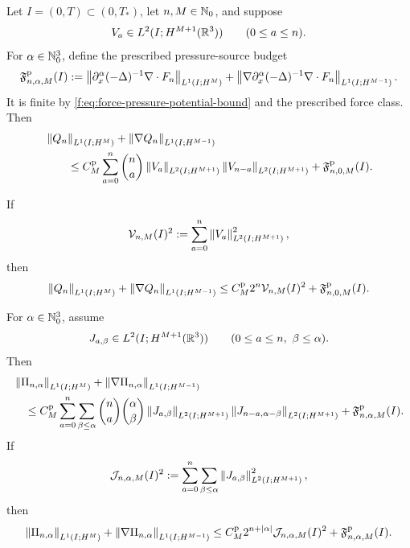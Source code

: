 \begin{theorem}
\label{f:thm:formal-finite-row-pressure}
Let \(I=(0,T)\subset(0,T_*)\), let \(n,M\in\mathbb N_0\), and suppose
\[
 V_a\in L^2(I;H^{M+1}(\mathbb R^3))
 \qquad(0\le a\le n).
\]
For \(\alpha\in\mathbb N_0^3\), define the prescribed pressure-source budget
\begin{equation}
 \mathfrak F^{\rm p}_{n,\alpha,M}(I)
 :=\left\lVert \partial_x^\alpha(-\Delta)^{-1}\nabla\cdot F_n\right\rVert_{L^1(I;H^M)}
 +\left\lVert \nabla\partial_x^\alpha(-\Delta)^{-1}\nabla\cdot F_n\right\rVert_{L^1(I;H^{M-1})}.
 \label{f:eq:force-pressure-budget}
\end{equation}
It is finite by \eqref{f:eq:force-pressure-potential-bound} and the prescribed
force class.
Then
\begin{align}
 &\left\lVert Q_n\right\rVert_{L^1(I;H^M)}
 +\left\lVert \nabla Q_n\right\rVert_{L^1(I;H^{M-1})}
 \notag\\
 &\qquad\le
 C_M^{\rm p}\sum_{a=0}^{n}\binom na
 \left\lVert V_a\right\rVert_{L^2(I;H^{M+1})}
 \left\lVert V_{n-a}\right\rVert_{L^2(I;H^{M+1})}
 +\mathfrak F^{\rm p}_{n,0,M}(I).
 \label{f:eq:formal-finite-pressure-L1}
\end{align}
\begin{samepage}
If
\[
 \mathcal V_{n,M}(I)^2
 :=\sum_{a=0}^{n}
 \left\lVert V_a\right\rVert_{L^2(I;H^{M+1})}^2,
\]
then
\begin{equation}
 \left\lVert Q_n\right\rVert_{L^1(I;H^M)}
 +\left\lVert \nabla Q_n\right\rVert_{L^1(I;H^{M-1})}
 \le C_M^{\rm p}2^n\mathcal V_{n,M}(I)^2
 +\mathfrak F^{\rm p}_{n,0,M}(I).
 \label{f:eq:formal-finite-pressure-compressed}
\end{equation}
\end{samepage}
For \(\alpha\in\mathbb N_0^3\), assume
\[
 J_{a,\beta}\in L^2(I;H^{M+1}(\mathbb R^3))
 \qquad
 (0\le a\le n,\ \beta\le\alpha).
\]
Then
\begin{align}
 &\left\lVert \Pi_{n,\alpha}\right\rVert_{L^1(I;H^M)}
 +\left\lVert \nabla\Pi_{n,\alpha}\right\rVert_{L^1(I;H^{M-1})}
 \notag\\
 &\quad\le
 C_M^{\rm p}
 \sum_{a=0}^{n}\sum_{\beta\le\alpha}
 \binom na\binom{\alpha}{\beta}
 \left\lVert J_{a,\beta}\right\rVert_{L^2(I;H^{M+1})}
 \left\lVert J_{n-a,\alpha-\beta}\right\rVert_{L^2(I;H^{M+1})}
 +\mathfrak F^{\rm p}_{n,\alpha,M}(I).
 \label{f:eq:formal-finite-mixed-pressure-L1}
\end{align}
If
\[
 \mathcal J_{n,\alpha,M}(I)^2
 :=
 \sum_{a=0}^{n}\sum_{\beta\le\alpha}
 \left\lVert J_{a,\beta}\right\rVert_{L^2(I;H^{M+1})}^2,
\]
then
\begin{equation}
 \left\lVert \Pi_{n,\alpha}\right\rVert_{L^1(I;H^M)}
 +\left\lVert \nabla\Pi_{n,\alpha}\right\rVert_{L^1(I;H^{M-1})}
 \le
 C_M^{\rm p}2^{n+|\alpha|}
 \mathcal J_{n,\alpha,M}(I)^2
 +\mathfrak F^{\rm p}_{n,\alpha,M}(I).
 \label{f:eq:formal-finite-mixed-pressure-compressed}
\end{equation}
\end{theorem}

